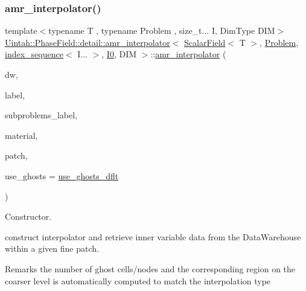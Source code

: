 \subsubsection{\texorpdfstring{amr\+\_\+interpolator()}{amr\_interpolator()}\hspace{0.1cm}{\footnotesize\ttfamily [3/4]}}
{\footnotesize\ttfamily template$<$typename T , typename Problem , size\+\_\+t... I, Dim\+Type D\+IM$>$ \\
\hyperlink{classUintah_1_1PhaseField_1_1detail_1_1amr__interpolator}{Uintah\+::\+Phase\+Field\+::detail\+::amr\+\_\+interpolator}$<$ \hyperlink{structUintah_1_1PhaseField_1_1ScalarField}{Scalar\+Field}$<$ T $>$, \hyperlink{classUintah_1_1PhaseField_1_1Problem}{Problem}, \hyperlink{namespaceUintah_1_1PhaseField_a237de804d99512e50613aff7c94a9461}{index\+\_\+sequence}$<$ I... $>$, \hyperlink{namespaceUintah_1_1PhaseField_a547ce3002aa97fbd3ef3192a6eec8406abdd8ebcbdfd71d1125937e3012dc45fb}{I0}, D\+IM $>$\+::\hyperlink{classUintah_1_1PhaseField_1_1detail_1_1amr__interpolator}{amr\+\_\+interpolator} (\begin{DoxyParamCaption}\item[{Data\+Warehouse $\ast$}]{dw,  }\item[{const typename \hyperlink{structUintah_1_1PhaseField_1_1ScalarField_a7a77875e030da64c47ce9f6c22a06959}{Field\+::label\+\_\+type} \&}]{label,  }\item[{const Var\+Label $\ast$}]{subproblems\+\_\+label,  }\item[{int}]{material,  }\item[{const Patch $\ast$}]{patch,  }\item[{bool}]{use\+\_\+ghosts = {\ttfamily \hyperlink{classUintah_1_1PhaseField_1_1detail_1_1amr__interpolator_3_01ScalarField_3_01T_01_4_00_01Problem64f2458f98b03e27672a091eecc4b696_a659b258bc11df07830b73859f57dee78}{use\+\_\+ghosts\+\_\+dflt}} }\end{DoxyParamCaption})\hspace{0.3cm}{\ttfamily [inline]}}



Constructor. 

construct interpolator and retrieve inner variable data from the Data\+Warehouse within a given fine patch.

\begin{DoxyRemark}{Remarks}
the number of ghost cells/nodes and the corresponding region on the coarser level is automatically computed to match the interpolation type
\end{DoxyRemark}

